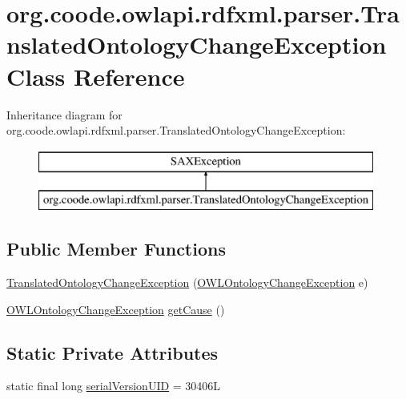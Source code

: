 \hypertarget{classorg_1_1coode_1_1owlapi_1_1rdfxml_1_1parser_1_1_translated_ontology_change_exception}{\section{org.\-coode.\-owlapi.\-rdfxml.\-parser.\-Translated\-Ontology\-Change\-Exception Class Reference}
\label{classorg_1_1coode_1_1owlapi_1_1rdfxml_1_1parser_1_1_translated_ontology_change_exception}
}
Inheritance diagram for org.\-coode.\-owlapi.\-rdfxml.\-parser.\-Translated\-Ontology\-Change\-Exception\-:\begin{figure}[H]
\begin{center}
\leavevmode
\includegraphics[height=2.000000cm]{classorg_1_1coode_1_1owlapi_1_1rdfxml_1_1parser_1_1_translated_ontology_change_exception}
\end{center}
\end{figure}
\subsection*{Public Member Functions}
\begin{DoxyCompactItemize}
\item 
\hyperlink{classorg_1_1coode_1_1owlapi_1_1rdfxml_1_1parser_1_1_translated_ontology_change_exception_a35d129cc43273ff46c9a20d06dc579cc}{Translated\-Ontology\-Change\-Exception} (\hyperlink{classorg_1_1semanticweb_1_1owlapi_1_1model_1_1_o_w_l_ontology_change_exception}{O\-W\-L\-Ontology\-Change\-Exception} e)
\item 
\hyperlink{classorg_1_1semanticweb_1_1owlapi_1_1model_1_1_o_w_l_ontology_change_exception}{O\-W\-L\-Ontology\-Change\-Exception} \hyperlink{classorg_1_1coode_1_1owlapi_1_1rdfxml_1_1parser_1_1_translated_ontology_change_exception_ab33c4311b0c86236695833cd2674cdb0}{get\-Cause} ()
\end{DoxyCompactItemize}
\subsection*{Static Private Attributes}
\begin{DoxyCompactItemize}
\item 
static final long \hyperlink{classorg_1_1coode_1_1owlapi_1_1rdfxml_1_1parser_1_1_translated_ontology_change_exception_a854114afb0d703c53964d1d98a5f1d9b}{serial\-Version\-U\-I\-D} = 30406\-L
\end{DoxyCompactItemize}


